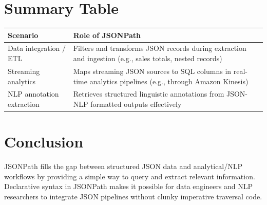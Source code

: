 \section{Summary Table}

\begin{tabular}{p{5cm} p{9cm}}
	\hline
	\textbf{Scenario} & \textbf{Role of JSONPath} \\
	\hline
	Data integration / ETL & Filters and transforms JSON records during extraction and ingestion (e.g., sales totals, nested records) \cite{jsonpath_data_analytics} \\
	Streaming analytics & Maps streaming JSON sources to SQL columns in real-time analytics pipelines (e.g., through Amazon Kinesis) \cite{kinesis_jsonpath} \\
	NLP annotation extraction & Retrieves structured linguistic annotations from JSON-NLP formatted outputs effectively \cite{json_nlp_schema} \\
	\hline
\end{tabular}

\section{Conclusion}

JSONPath fills the gap between structured JSON data and analytical/NLP workflows by providing a simple way to query and extract relevant information. Declarative syntax in JSONPath makes it possible for data engineers and NLP researchers to integrate JSON pipelines without clunky imperative traversal code.